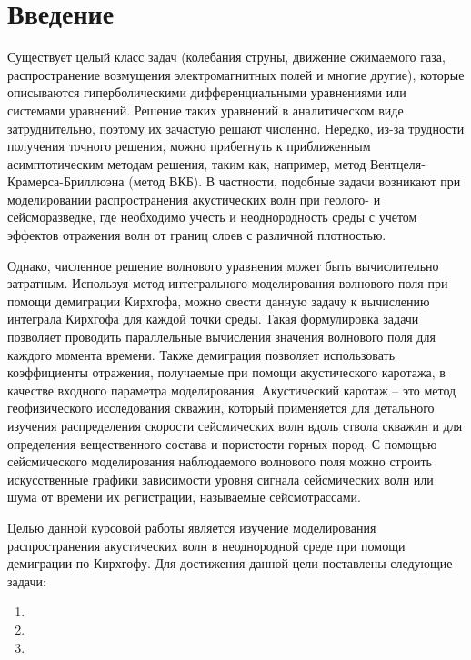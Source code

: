 \documentclass[a4paper, fontsize=14pt]{article}
\begin{document}

\newpage
\tableofcontents
\newpage
\section*{Введение}

Существует целый класс задач (колебания струны,
движение сжимаемого газа, распространение возмущения электромагнитных полей и многие другие), которые
описываются гиперболическими дифференциальными уравнениями или системами уравнений.
Решение таких уравнений в аналитическом виде
затруднительно, поэтому их зачастую решают численно.
Нередко, из-за трудности получения точного решения, можно прибегнуть к приближенным асимптотическим
методам решения, таким как, например, метод Вентцеля-Крамерса-Бриллюэна (метод ВКБ).
В частности, подобные задачи возникают при моделировании
распространения акустических волн при геолого- и сейсморазведке, где необходимо учесть
и неоднородность среды с учетом эффектов отражения волн от границ слоев с различной плотностью.

Однако, численное решение волнового уравнения может быть
вычислительно затратным. Используя метод интегрального моделирования волнового поля при помощи
демиграции Кирхгофа, можно свести
данную задачу к вычислению интеграла Кирхгофа для каждой точки среды. Такая формулировка задачи
позволяет проводить параллельные вычисления значения волнового поля для каждого момента времени. 
Также демиграция позволяет использовать коэффициенты отражения, получаемые при помощи акустического
каротажа, в качестве входного параметра моделирования.
Акустический каротаж -- это метод геофизического исследования скважин, который применяется для
детального изучения  распределения скорости сейсмических волн вдоль ствола скважин и для определения
вещественного состава и пористости горных пород.
С помощью сейсмического моделирования
наблюдаемого волнового поля можно строить искусственные графики зависимости уровня сигнала 
сейсмических волн или шума от времени их регистрации, называемые сейсмотрассами.

Целью данной курсовой работы является изучение моделирования распространения акустических волн в неоднородной
среде при помощи демиграции по Кирхгофу.
Для достижения данной цели поставлены следующие задачи:
\begin{enumerate}
    \item 
    \item
    \item 
\end{enumerate}
\newpage
\end{document}
